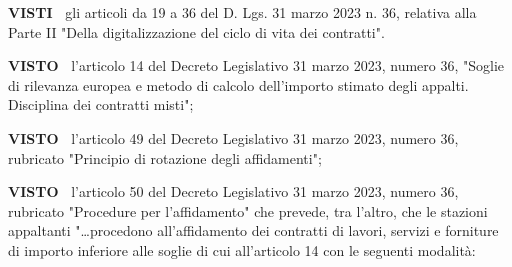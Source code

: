 \textbf{VISTI~}	gli articoli da 19 a 36 del D. Lgs. 31 marzo 2023 n. 36,
relativa alla Parte II "Della digitalizzazione del ciclo di vita dei
contratti".

\textbf{VISTO~}                   l'articolo 14 del Decreto Legislativo
31 marzo 2023, numero 36, "Soglie di rilevanza    europea e metodo di
calcolo dell'importo stimato degli appalti. Disciplina dei contratti
misti"; 

\textbf{VISTO~}	l'articolo 49 del Decreto Legislativo 31 marzo 2023,
numero 36, rubricato "Principio di rotazione degli affidamenti";


\textbf{VISTO~}	l'articolo 50 del Decreto Legislativo 31 marzo 2023,
numero 36, rubricato "Procedure per l'affidamento" che prevede,
tra l'altro, che le stazioni appaltanti "…procedono all'affidamento
dei contratti di lavori, servizi e forniture di importo inferiore alle
soglie di cui all'articolo 14 con le seguenti modalità:


